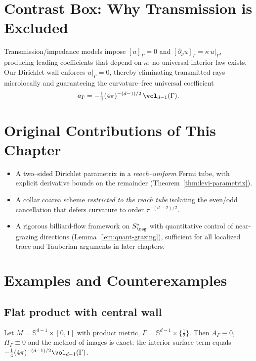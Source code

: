 \section*{Contrast Box: Why Transmission is Excluded}
Transmission/impedance models impose $[u]_\Gamma=0$ and $[\partial_\nu u]_\Gamma=\kappa\,u|_\Gamma$, producing leading coefficients that depend on $\kappa$; no universal interior law exists. 
Our Dirichlet wall enforces $u|_\Gamma=0$, thereby eliminating transmitted rays microlocally and guaranteeing the curvature–free universal coefficient
\[
a_\Gamma=-\tfrac14(4\pi)^{-(d-1)/2}\,\vol_{d-1}(\Gamma).
\]

\section*{Original Contributions of This Chapter}
\begin{itemize}
  \item A two–sided Dirichlet parametrix in a \emph{reach–uniform} Fermi tube, with explicit derivative bounds on the remainder (Theorem~\ref{thm:levi-parametrix}).
  \item A collar coarea scheme \emph{restricted to the reach tube} isolating the even/odd cancellation that defers curvature to order $\tau^{-(d-2)/2}$.
  \item A rigorous billiard-flow framework on $S^*_{\reg}$ with quantitative control of near-grazing directions (Lemma~\ref{lem:quant-grazing}), sufficient for all localized trace and Tauberian arguments in later chapters.
\end{itemize}

\section{Examples and Counterexamples}
\label{sec:examples-counterexamples}

\subsection{Flat product with central wall}
Let $M=\mathbb S^{d-1}\times[0,1]$ with product metric, $\Gamma=\mathbb S^{d-1}\times\{\frac12\}$. Then $A_\Gamma\equiv0$, $H_\Gamma\equiv0$ and the method of images is exact; the interior surface term equals $-\frac14(4\pi)^{-(d-1)/2}\vol_{d-1}(\Gamma)$.

